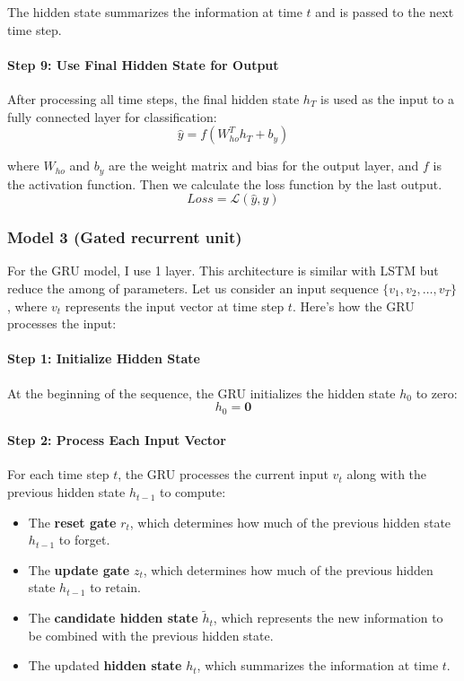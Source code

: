 \documentclass[12pt,a4paper]{article}
\begin{document}
The hidden state summarizes the information at time $t$ and is passed to the next time step.

\paragraph{Step 9: Use Final Hidden State for Output}
After processing all time steps, the final hidden state $h_T$ is used as the input to a fully connected layer for classification:
\begin{equation}
    \hat{y} = f(W_{ho}^T h_T + b_y)    
\end{equation}

where $W_{ho}$ and $b_y$ are the weight matrix and bias for the output layer, and $f$ is the activation function. Then we calculate the loss function by the last output.
\begin{equation}
    Loss = \mathcal{L}(\hat{y}, y)
\end{equation}


\subsubsection{Model 3 (Gated recurrent unit)}
For the GRU model, I use 1 layer. This architecture is similar with LSTM but reduce the among of parameters. Let us consider an input sequence $\{v_1, v_2, \dots, v_T\}$, where $v_t$ represents the input vector at time step $t$. Here's how the GRU processes the input:
\paragraph{Step 1: Initialize Hidden State}
At the beginning of the sequence, the GRU initializes the hidden state $h_0$ to zero:
\begin{equation}
    h_0 = \mathbf{0}
\end{equation}

\paragraph{Step 2: Process Each Input Vector}
For each time step $t$, the GRU processes the current input $v_t$ along with the previous hidden state $h_{t-1}$ to compute:
\begin{itemize}
    \item The \textbf{reset gate} $r_t$, which determines how much of the previous hidden state $h_{t-1}$ to forget.
    \item The \textbf{update gate} $z_t$, which determines how much of the previous hidden state $h_{t-1}$ to retain.
    \item The \textbf{candidate hidden state} $\tilde{h}_t$, which represents the new information to be combined with the previous hidden state.
    \item The updated \textbf{hidden state} $h_t$, which summarizes the information at time $t$.
\end{itemize}
\end{document}
